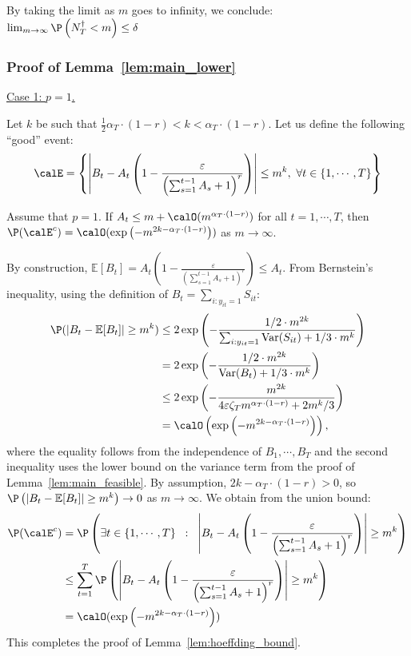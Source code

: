 \documentclass[blindrev]{informs3noheader}
\begin{document}
By taking the limit as $m$ goes to infinity, we conclude: $\lim_{m \to \infty}\P\left(N^\dagger_T<m\right)\leq\delta$
\hfill\Halmos

\subsubsection{Proof of Lemma~\ref{lem:main_lower}}
\label{app:unif_prob_bin_determin_sto}

\underline{Case 1: $p=1$.}

Let $k$ be such that $\frac{1}{2}\alpha_T\cdot(1-r)<k<\alpha_T\cdot(1-r)$. Let us define the following ``good'' event:
$$\calE=\left\{\left|B_t - A_t \left(1 -\frac{\varepsilon}{\left(\sum_{s=1}^{t-1} A_s +1\right)^r}\right)\right|\leq m^k,\ \forall t \in \{1,\cdots, T\}\right\}$$

\begin{lemma}\label{lem:hoeffding_bound}
Assume that $p=1$. If $A_t\leq m+ \calO(m^{\alpha_T \cdot (1-r)})$ for all $t=1,\cdots, T$, then $\P(\calE^c) =\calO(\exp\left(-m^{2k-\alpha_T\cdot(1-r)}\right))$ as $m \to \infty$.
\end{lemma}
By construction, $\mathbb{E}[B_t] = A_t \left(1 -\frac{\varepsilon}{\left(\sum_{s=1}^{t-1} A_s +1\right)^r}\right)\leq A_t$. From Bernstein's inequality, using the definition of $B_t=\sum_{i:y_{it}=1}S_{it}$:
\begin{align*}
    \P(|B_t - \mathbb{E}[B_t]| \geq m^k)
    &\leq 2\exp\left(-\frac{1/2\cdot m^{2k}}{\sum_{i:y_{it}=1}\text{Var}(S_{it})+1/3\cdot m^k}\right)\\
    &= 2\exp\left(-\frac{1/2\cdot m^{2k}}{\text{Var}(B_t)+1/3\cdot m^k}\right)\\
    &\leq 2\exp\left(-\frac{m^{2k}}{4\varepsilon \zeta_T m^{\alpha_T\cdot(1-r)} + 2m^k/3}\right)\\
    &= \calO\left(\exp\left(-m^{2k-\alpha_T\cdot(1-r)}\right)\right),
\end{align*}
where the equality follows from the independence of $B_1,\cdots,B_T$ and the second inequality uses the lower bound on the variance term from the proof of Lemma~\ref{lem:main_feasible}. By assumption, $2k - \alpha_T\cdot(1-r) > 0$, so $\P\left(|B_t - \mathbb{E}[B_t]| \geq m^k\right) \to 0$ as $m \to \infty$. We obtain from the union bound:
\begin{align*}
\P(\calE^c)
&=\P\left(\exists t \in \{1,\cdots, T\} \;\; : \;\; \left|B_t - A_t \left(1 -\frac{\varepsilon}{\left(\sum_{s=1}^{t-1} A_s +1\right)^r}\right)\right|\geq m^k\right)\\
&\leq \sum_{t=1}^T \P\left(\left|B_t - A_t \left(1 -\frac{\varepsilon}{\left(\sum_{s=1}^{t-1} A_s +1\right)^r}\right)\right|\geq m^k\right)\\
& =\calO(\exp\left(-m^{2k-\alpha_T\cdot(1-r)}\right))
\end{align*}
This completes the proof of Lemma~\ref{lem:hoeffding_bound}.\hfill\Halmos\endproof
\end{document}
